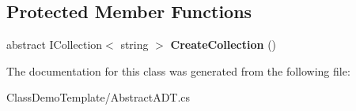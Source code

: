 \subsection*{Protected Member Functions}
\begin{DoxyCompactItemize}
\item 
\mbox{\label{class_class_demo_template_1_1_abstract_a_d_t_a4770555bf63f5277f075b1c8fbdc09e3}} 
abstract I\+Collection$<$ string $>$ {\bfseries Create\+Collection} ()
\end{DoxyCompactItemize}


The documentation for this class was generated from the following file\+:\begin{DoxyCompactItemize}
\item 
Class\+Demo\+Template/Abstract\+A\+D\+T.\+cs\end{DoxyCompactItemize}
